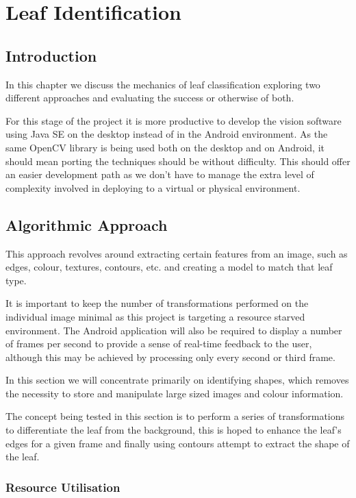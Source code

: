 \chapter{Leaf Identification}

\section{Introduction}
In this chapter we discuss the mechanics of leaf classification exploring two different approaches and evaluating the success or otherwise of both.

For this stage of the project it is more productive to develop the vision software using Java SE on the desktop instead of in the Android environment. As the same OpenCV library is being used both on the desktop and on Android, it should mean porting the techniques should be without difficulty. This should offer an easier development path as we don't have to manage the extra level of complexity involved in deploying to a virtual or physical environment. 


\section{Algorithmic Approach}

This approach revolves around extracting certain features from an image, such as edges, colour, textures, contours, etc. and creating a model to match that leaf type.

It is important to keep the number of transformations performed on the individual image minimal as this project is targeting a resource starved environment. The Android application will also be required to display a number of frames per second to provide a sense of real-time feedback to the user, although this may be achieved by processing only every second or third frame.

In this section we will concentrate primarily on identifying shapes, which removes the necessity to store and manipulate large sized images and colour information. 

The concept being tested in this section is to perform a series of transformations to differentiate the leaf from the background, this is hoped to enhance the leaf’s edges for a given frame and finally using contours attempt to extract the shape of the leaf. 

\subsection{Resource Utilisation}

